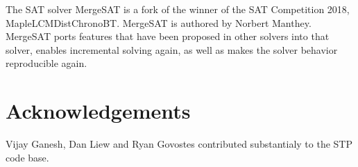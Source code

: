 \documentclass{easychair}
\begin{document}
The SAT solver MergeSAT is a fork of the winner of the SAT Competition 2018, MapleLCMDistChronoBT. MergeSAT is authored by Norbert Manthey. 
MergeSAT ports features that have been proposed in other solvers into that solver, enables incremental solving again, as well as makes the solver behavior reproducible again.

\section*{Acknowledgements}
Vijay Ganesh, Dan Liew and Ryan Govostes contributed substantialy to the STP code base.




\vfill
\pagebreak
\end{document}
